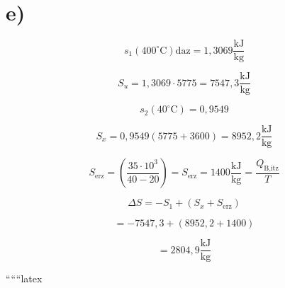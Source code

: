 

\section*{e)}

\[
s_1 (400^\circ \text{C}) \text{daz} = 1,3069 \frac{\text{kJ}}{\text{kg}}
\]

\[
S_u = 1,3069 \cdot 5775 = 7547,3 \frac{\text{kJ}}{\text{kg}}
\]

\[
s_2 (40^\circ \text{C}) = 0,9549
\]

\[
S_x = 0,9549 (5775 + 3600) = 8952,2 \frac{\text{kJ}}{\text{kg}}
\]

\[
S_{\text{erz}} = \left( \frac{35 \cdot 10^3}{40 - 20} \right) = S_{\text{erz}} = 1400 \frac{\text{kJ}}{\text{kg}} = \frac{Q_{\text{B,itz}}}{T}
\]

\[
\Delta S = -S_1 + (S_x + S_{\text{erz}})
\]

\[
= -7547,3 + (8952,2 + 1400)
\]

\[
= 2804,9 \frac{\text{kJ}}{\text{kg}}
\]

``````latex